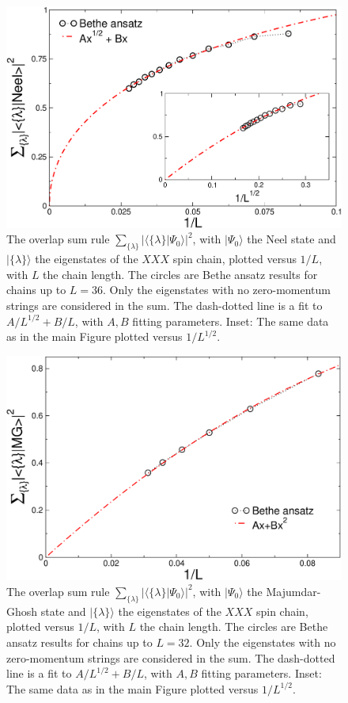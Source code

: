 \documentclass[11pt]{iopart}
\begin{document}
\begin{figure}[t]
\begin{center}
\includegraphics[width=.6\textwidth]{./draft_figs/Neel_over}
\end{center}
\caption{ The overlap sum rule $\sum_{\{\lambda\}}|\langle\{\lambda\}|\Psi_0\rangle|^2$, 
 with $|\Psi_0\rangle$ the Neel state and $|\{\lambda\}\rangle$ the eigenstates  of the 
 $XXX$ spin chain, plotted versus $1/L$, with $L$ the chain length. The circles are 
 Bethe ansatz results for chains up to $L=36$. Only the eigenstates with no zero-momentum 
 strings are considered in the sum. The dash-dotted line is a fit to $A/L^{1/2}+B/L$, with 
 $A,B$ fitting parameters. Inset: The same data as in the main Figure plotted versus 
 $1/L^{1/2}$.
}
\label{fig2-neel-sr}
\end{figure}


\begin{figure}[t]
\begin{center}
\includegraphics[width=.6\textwidth]{./draft_figs/Dimer_over}
\end{center}
\caption{ The overlap sum rule $\sum_{\{\lambda\}}|\langle\{\lambda\}|\Psi_0\rangle|^2$, 
 with $|\Psi_0\rangle$ the Majumdar-Ghosh state and $|\{\lambda\}\rangle$ the eigenstates  
 of the $XXX$ spin chain, plotted versus $1/L$, with $L$ the chain length. The circles are 
 Bethe ansatz results for chains up to $L=32$. Only the eigenstates with no zero-momentum 
 strings are considered in the sum. The dash-dotted line is a fit to $A/L^{1/2}+B/L$, with 
 $A,B$ fitting parameters. Inset: The same data as in the main Figure plotted versus 
 $1/L^{1/2}$.
}
\label{fig3-dimer-sr}
\end{figure}
\end{document}
